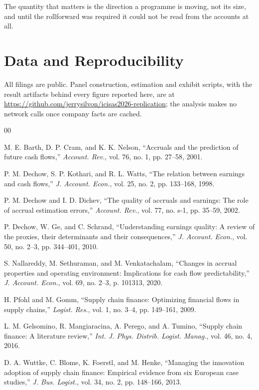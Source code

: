 \documentclass[conference,a4paper]{IEEEtran}
\begin{document}
The quantity that matters is the direction a programme is moving, not its size,
and until the rollforward was required it could not be read from the accounts at
all.

\section*{Data and Reproducibility}

All filings are public. Panel construction, estimation and exhibit scripts, with
the result artifacts behind every figure reported here, are at
\url{https://github.com/jerrysilvon/icisas2026-replication}; the analysis makes
no network calls once company facts are cached.

\begin{thebibliography}{00}

 M. E. Barth, D. P. Cram, and K. K. Nelson, ``Accruals and the prediction of future cash flows,'' \textit{Account. Rev.}, vol. 76, no. 1, pp. 27--58, 2001.

 P. M. Dechow, S. P. Kothari, and R. L. Watts, ``The relation between earnings and cash flows,'' \textit{J. Account. Econ.}, vol. 25, no. 2, pp. 133--168, 1998.

 P. M. Dechow and I. D. Dichev, ``The quality of accruals and earnings: The role of accrual estimation errors,'' \textit{Account. Rev.}, vol. 77, no. s-1, pp. 35--59, 2002.

 P. Dechow, W. Ge, and C. Schrand, ``Understanding earnings quality: A review of the proxies, their determinants and their consequences,'' \textit{J. Account. Econ.}, vol. 50, no. 2--3, pp. 344--401, 2010.

 S. Nallareddy, M. Sethuraman, and M. Venkatachalam, ``Changes in accrual properties and operating environment: Implications for cash flow predictability,'' \textit{J. Account. Econ.}, vol. 69, no. 2--3, p. 101313, 2020.

 H. Pfohl and M. Gomm, ``Supply chain finance: Optimizing financial flows in supply chains,'' \textit{Logist. Res.}, vol. 1, no. 3--4, pp. 149--161, 2009.

 L. M. Gelsomino, R. Mangiaracina, A. Perego, and A. Tumino, ``Supply chain finance: A literature review,'' \textit{Int. J. Phys. Distrib. Logist. Manag.}, vol. 46, no. 4, 2016.

 D. A. Wuttke, C. Blome, K. Foerstl, and M. Henke, ``Managing the innovation adoption of supply chain finance: Empirical evidence from six European case studies,'' \textit{J. Bus. Logist.}, vol. 34, no. 2, pp. 148--166, 2013.


\end{thebibliography}
\end{document}
